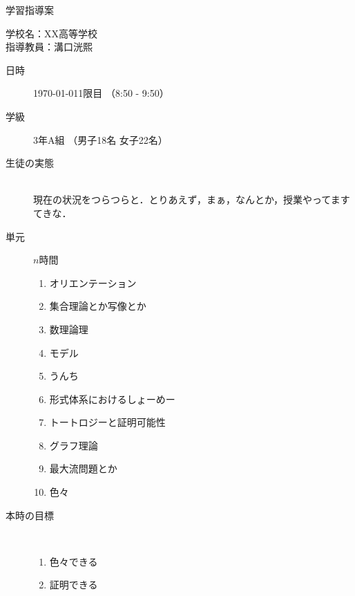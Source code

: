 \documentclass[a4j,14pt]{jsarticle}
\begin{document}
\begin{center}
    {\LARGE 学習指導案}
\end{center}
\begin{flushright}
    学校名：XX高等学校\\
    指導教員：溝口洸熙
\end{flushright}
\begin{description}
    \item[日時] \today 1限目 （8:50 - 9:50）
    \item[学級] 3年A組 （男子18名 女子22名）
    \item[生徒の実態] \ \\
        現在の状況をつらつらと．とりあえず，まぁ，なんとか，授業やってますてきな．
    \item[単元] \(n\)時間\\
        \begin{minipage}[t]{0.45\linewidth}
            \centering
            \begin{enumerate}
                \item オリエンテーション
                \item 集合理論とか写像とか
                \item 数理論理
                \item モデル
                \item うんち
            \end{enumerate}
        \end{minipage}
        \begin{minipage}[t]{0.45\linewidth}
            \centering
            \begin{enumerate}
                \setcounter{enumi}{5}
                \item 形式体系におけるしょーめー
                \item トートロジーと証明可能性
                \item グラフ理論
                \item 最大流問題とか
                \item 色々
            \end{enumerate}
        \end{minipage}
        \vspace{1em}
        \item[本時の目標]\
        \begin{enumerate}
            \item 色々できる
            \item 証明できる

\end{enumerate}
\end{description}
\end{document}
